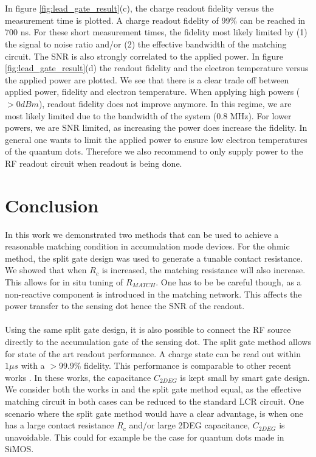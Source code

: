 \documentclass{article}
\begin{document}
	\\ \\
	In figure \ref{fig:lead_gate_result}(c), the charge readout fidelity versus the measurement time is plotted. A charge readout fidelity of 99\% can be reached in 700 ns. For these short measurement times, the fidelity most likely limited by (1) the signal to noise ratio and/or (2) the effective bandwidth of the matching circuit. The SNR is also strongly correlated to the applied power. In figure \ref{fig:lead_gate_result}(d) the readout fidelity and the electron temperature versus the applied power are plotted. We see that there is a clear trade off between applied power, fidelity and electron temperature.  
	When applying high powers ($>0dBm$), readout fidelity does not improve anymore. In this regime, we are most likely limited due to the bandwidth of the system (0.8 MHz). For lower powers, we are SNR limited, as increasing the power does increase the fidelity. In general one wants to limit the applied power to ensure low electron temperatures of the quantum dots. Therefore we also recommend to only supply power to the RF readout circuit when readout is being done. 

\section{Conclusion}
In this work we demonstrated two methods that can be used to achieve a reasonable matching condition in accumulation mode devices. For the ohmic method, the split gate design was used to generate a tunable contact resistance. We showed that when $R_c$ is increased, the matching resistance will also increase. This allows for in situ tuning of $R_{MATCH}$. One has to be be careful though, as a non-reactive component is introduced in the matching network. This affects the power transfer to the sensing dot hence the SNR of the readout. \\ \\
Using the same split gate design, it is also possible to connect the RF source directly to the accumulation gate of the sensing dot. The split gate method allows for state of the art readout performance. A charge state can be read out within $1\mu s$ with a $>$99.9\% fidelity. This performance is comparable to other recent works \cite{Connors2020,noiri2020radio}. In these works, the capacitance $C_{2DEG}$ is kept small by smart gate design. We consider both the works in \cite{Connors2020,noiri2020radio} and the split gate method equal, as the effective matching circuit in both cases can be reduced to the standard LCR circuit. One scenario where the split gate method would have a clear advantage, is when one has a large contact resistance $R_c$ and/or large 2DEG capacitance, $C_{2DEG}$ is unavoidable. This could for example be the case for quantum dots made in SiMOS.
\\
\\
\end{document}
